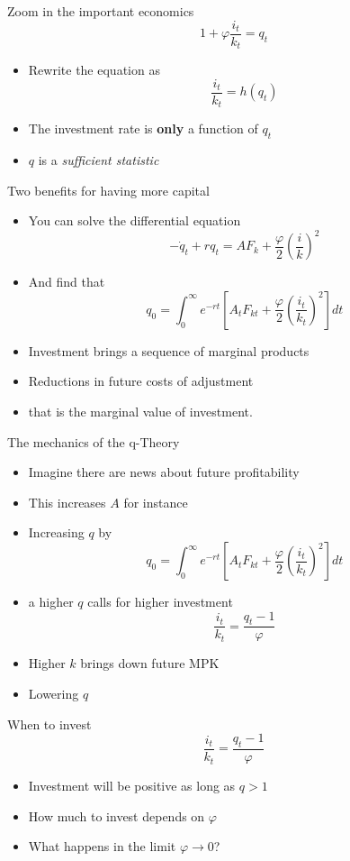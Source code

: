 \documentclass[11pt,aspectratio=169,xcolor={dvipsnames},hyperref={pdftex,pdfpagemode=UseNone,hidelinks,pdfdisplaydoctitle=true},usepdftitle=false]{beamer}
\begin{document}
\begin{frame}{Zoom in the important economics}
$$1 + \varphi \frac{i_t}{k_t}  = q_t$$
\begin{itemize}
\item Rewrite the equation as
$$\frac{i_t}{k_t} = h(q_t)$$
\item The investment rate is \textbf{only} a function of $q_t$
\pause 
\item $q$ is a \textit{sufficient statistic}
\end{itemize}
\end{frame}

\begin{frame}{Two benefits for having more capital}
\begin{itemize}
\item You can solve the differential equation
$$-\dot{q}_t + r q_t = AF_k +\frac{\varphi}{2} \left(\frac{i}{k}\right)^2$$
\item And find that
$$q_0 = \int_0^{\infty} e^{-rt} \left[ A_t F_{kt} +  \frac{\varphi}{2}  \left(\frac{i_t}{k_t}\right)^2 \right]dt$$
\item Investment brings a sequence of marginal products
\pause
\item Reductions in future costs of adjustment
\pause
\item that is the marginal value of investment.
\end{itemize}
\end{frame}

\begin{frame}{The mechanics of the q-Theory}
\begin{itemize}
\item Imagine there are news about future profitability
\pause
\item This increases $A$ for instance
\item Increasing $q$ by
$$q_0 = \int_0^{\infty} e^{-rt} \left[ A_tF_{kt} +  \frac{\varphi}{2} \left(\frac{i_t}{k_t}\right)^2 \right]dt$$
\pause
\item a higher $q$ calls for higher investment
$$\frac{i_t}{k_t}  = \frac{q_t -1}{\varphi} $$
\item Higher $k$ brings down future MPK
\item Lowering $q$
\end{itemize}
\end{frame}

\begin{frame}{When to invest}
$$\frac{i_t}{k_t}  = \frac{q_t -1}{\varphi} $$
\begin{itemize}
\pause
\item Investment will be positive as long as $q>1$
\pause
\item How much to invest depends on $\varphi$
\pause
\item What happens in the limit $\varphi \rightarrow 0$?
\end{itemize}
\end{frame}
\end{document}
